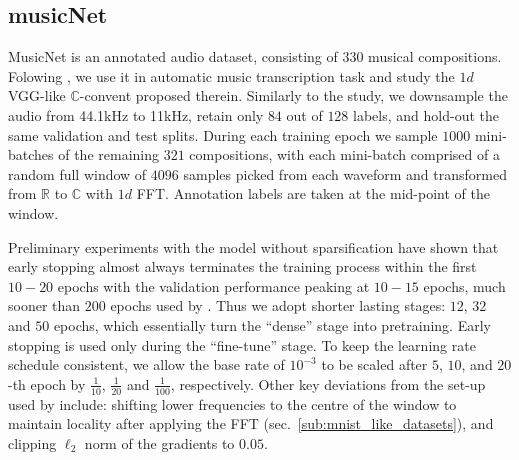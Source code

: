 \documentclass[a4paper,10pt]{article}
\newcommand{\real}{\mathbb{R}}
\newcommand{\cplx}{\mathbb{C}}
\begin{document}


\subsection{musicNet} %
\label{sub:musicnet}

MusicNet \citep{thickstun_learning_2017} is an annotated audio dataset, consisting of $330$
musical compositions. Folowing \citet{trabelsi_deep_2017}, we use it in automatic music
transcription task and study the $1d$ VGG-like $\cplx$-convent proposed therein. Similarly to
the study, we downsample the audio from 44.1kHz to 11kHz, retain only $84$ out of $128$ labels,
and hold-out the same validation and test splits. During each training epoch we sample $1000$
mini-batches of the remaining $321$ compositions, with each mini-batch comprised of a random
full window of $4096$ samples picked from each waveform and transformed from $\real$ to
$\cplx$ with $1d$ FFT. Annotation labels are taken at the mid-point of the window.

Preliminary experiments with the model without sparsification have shown that early stopping
almost always terminates the training process within the first $10-20$ epochs with the validation
performance peaking at $10-15$ epochs, much sooner than $200$ epochs used by \citet{trabelsi_deep_2017}.
Thus we adopt shorter lasting stages: $12$, $32$ and $50$ epochs, which essentially turn the
``dense'' stage into pretraining. Early stopping is used only during the ``fine-tune'' stage.
To keep the learning rate schedule consistent, we allow the base rate of $10^{-3}$ to be scaled
after $5$, $10$, and $20$-th epoch by $\tfrac1{10}$, $\tfrac1{20}$ and $\tfrac1{100}$, respectively.
Other key deviations from the set-up used by \citet{trabelsi_deep_2017} include: shifting lower
frequencies to the centre of the window to maintain locality after applying the FFT
(sec.~\ref{sub:mnist_like_datasets}), and clipping $\ell_2$ norm of the gradients to $0.05$.
\end{document}

